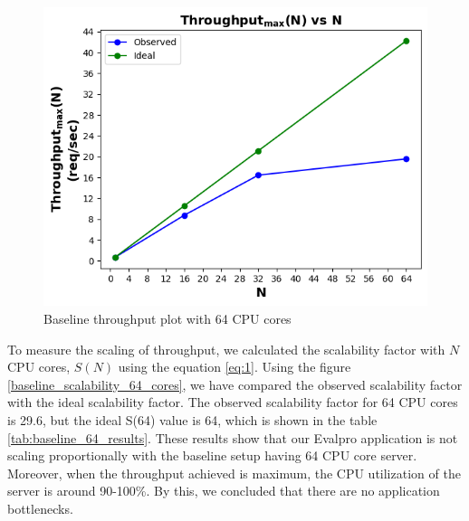 \documentclass{iitbreport}
\begin{document}
\begin{figure}[!htb]
  \centering
  \includegraphics[width=\linewidth]{Images/Baseline-64_throughput.png}
  \caption{Baseline throughput plot with 64 CPU cores}
  \label{baseline_throughput_64_cores}
\end{figure}

To measure the scaling of throughput, we calculated the scalability factor with $N$ CPU cores, $S(N)$ using the equation \ref{eq:1}. Using the figure \ref{baseline_scalability_64_cores}, we have compared the observed scalability factor with the ideal scalability factor. The observed scalability factor for 64 CPU cores is 29.6, but the ideal  S(64) value is 64, which is shown in the table \ref{tab:baseline_64_results}. These results show that our Evalpro application is not scaling proportionally with the baseline setup having 64 CPU core server. Moreover, when the throughput achieved is maximum, the CPU utilization of the server is around 90-100\%. By this, we concluded that there are no application bottlenecks. 
\end{document}
